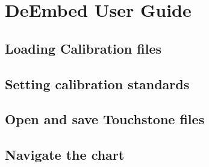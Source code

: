 \section{DeEmbed User Guide}
\subsection{Loading Calibration files}
\subsection{Setting calibration standards}
\subsection{Open and save Touchstone files}
\subsection{Navigate the chart}
\newpage
